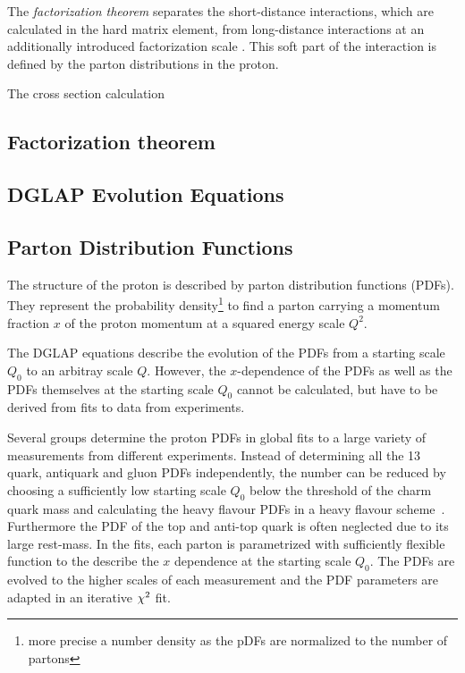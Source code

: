 The \emph{factorization theorem} separates the short-distance interactions,
which are calculated in the hard matrix element, from long-distance
interactions at an additionally introduced factorization scale \muf. This soft
part of the interaction is defined by the parton distributions in the proton.

The cross section calculation 

\subsection{Factorization theorem}


\subsection{DGLAP Evolution Equations}


\subsection{Parton Distribution Functions}

The structure of the proton is described by parton distribution functions
(PDFs).
They represent the probability density\footnote{more precise a number density as
the pDFs are normalized to the number of partons} to find a parton carrying a momentum
fraction $x$ of the proton momentum at a squared energy scale $Q^2$. 

The DGLAP equations describe the evolution of the PDFs from a starting scale
$Q_0$ to an arbitray scale $Q$. However, the $x$-dependence of the PDFs as well
as the PDFs themselves at the starting scale $Q_0$ cannot be calculated, but
have to be derived from fits to data from experiments.

Several groups determine the proton PDFs in global fits to a large variety of
measurements from different experiments. Instead of determining all the 13 quark,
antiquark and gluon PDFs independently, the number can be reduced by choosing a
sufficiently low starting scale $Q_0$ below the threshold of the charm quark
mass and calculating the heavy flavour PDFs in a heavy flavour
scheme~\cite{rt_scheme}. Furthermore the PDF of the top and anti-top quark is
often neglected due to its large rest-mass. In the fits, each parton is
parametrized with sufficiently flexible function to the describe the $x$
dependence at the starting scale $Q_0$. The PDFs are evolved to the higher
scales of each measurement and the PDF parameters are adapted in an iterative
$\chi^2$ fit.

